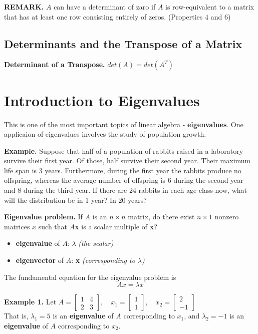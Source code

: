 \documentclass{article}
\newcommand\B{\textbf}
\newcommand\tcl{\begin{tcolorbox}[colback = {blue9}]}
\newcommand\etcl{\end{tcolorbox}}
\newcommand\x{\times}
\begin{document}
    \B{REMARK. } $A$ can have a determinant of zaro if $A$ is row-equivalent to a matrix that has at least one row
    consisting entirely of zeros. (Properties $4$ and $6$)

    \subsection{Determinants and the Transpose of a Matrix}
    \tcl
        \B{Determinant of a Transpose. } $det(A) = det(A^T)$
    \etcl

    \section{Introduction to Eigenvalues}
    This is one of the most important topics of linear algebra - \B{eigenvalues}. One applicaion of eigenvalues
    involves the study of population growth. 

    \textbf{Example.} Suppose that half of a population of rabbits raised in a laboratory
    survive their first year. Of those, half survive their second year. Their maximum life span is
    3 years. Furthermore, during the first year the rabbits produce no offspring, whereas the
    average number of offspring is 6 during the second year and 8 during the third year. If there
    are 24 rabbits in each age class now, what will the distribution be in 1 year? In 20 years?

    \tcl
    \B{Eigenvalue problem.} If $A$ is an $n \x n$ matrix, do there exist $n \x 1$ nonzero matrices $x$ such that $A$\B{x} is a scalar
    multiple of \B{x}?
    \begin{itemize}
        \item \B{eigenvalue} of $A$: $\lambda$ \textit{(the scalar)}
        \item \B{eigenvector} of $A$: \B{x} \textit{(corresponding to $\lambda$)}
    \end{itemize}
    The fundamental equation for the eigenvalue problem is
    \[ Ax = \lambda x\]
    \etcl

    \B{Example 1.} Let $A = \begin{bmatrix}
        1 & 4 \\
        2 & 3
    \end{bmatrix}, \quad x_1 = \begin{bmatrix}
        1 \\ 1
    \end{bmatrix}, \quad x_2 = \begin{bmatrix}
        2 \\ -1
    \end{bmatrix}$\\
    That is, $\lambda_1 = 5$ is an \B{eigenvalue} of $A$ corresponding to $x_1$, and $\lambda_2 = -1$ is an \B{eigenvalue} of $A$
    corresponding to $x_2$.
\end{document}
